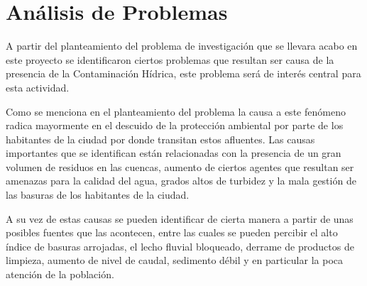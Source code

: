 \section{Análisis de Problemas}
    
    A partir del planteamiento del problema de investigación que se llevara acabo en este proyecto se identificaron ciertos problemas que resultan ser causa de la presencia de la Contaminación Hídrica, este problema será de interés central para esta actividad.

    Como se menciona en el planteamiento del problema la causa a este fenómeno radica mayormente en el descuido de la protección ambiental por parte de los habitantes de la ciudad por donde transitan estos afluentes. Las causas importantes que se identifican están relacionadas con la presencia de un gran volumen de residuos en las cuencas, aumento de ciertos agentes que resultan ser amenazas para la calidad del agua, grados altos de turbidez y la mala gestión de las basuras de los habitantes de la ciudad.

    A su vez de estas causas se pueden identificar de cierta manera a partir de unas posibles fuentes que las acontecen, entre las cuales se pueden percibir el alto índice de basuras arrojadas, el lecho fluvial bloqueado, derrame de productos de limpieza, aumento de nivel de caudal, sedimento débil y en particular la poca atención de la población. 

